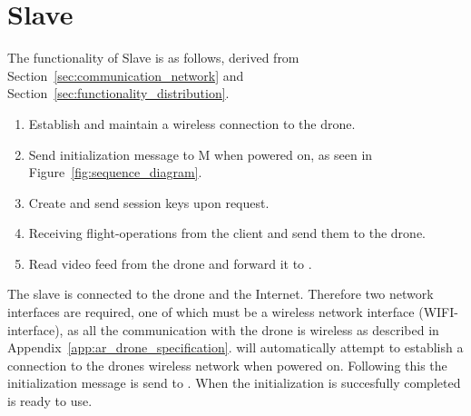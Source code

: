 \section{Slave}
\label{sec:design_slave}
The functionality of Slave is as follows, derived from Section~\ref{sec:communication_network} and Section~\ref{sec:functionality_distribution}.



\begin{enumerate}
	\item Establish and maintain a wireless connection to the drone.
	\item Send initialization message to M when powered on, as seen in Figure~\ref{fig:sequence_diagram}.
	\item Create and send session keys upon request.
	\item Receiving flight-operations from the client and send them to the drone.
	\item Read video feed from the drone and forward it to .
\end{enumerate}

The slave is connected to the drone and the Internet.
Therefore two network interfaces are required, one of which must be a wireless network interface (WIFI-interface), as all the communication with the drone is wireless as described in Appendix~\ref{app:ar_drone_specification}.
 will automatically attempt to establish a connection to the drones wireless network when powered on.
Following this the initialization message is send to .
When the initialization is succesfully completed  is ready to use. \\







